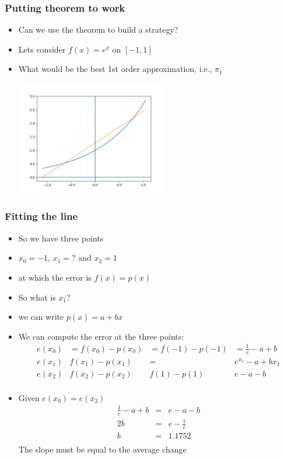 \documentclass[10pt]{beamer}
\begin{document}
\begin{frame}
  \frametitle{Putting theorem to work}
  \begin{itemize}
  \item Can we use the theorem to build a strategy? 
  \item Lets consider $f(x) = e^x \mbox{ on } [-1, 1]$
  \item What would be the best 1st order approximation, i.e., $\pi_1$
    \centerline{\includegraphics[height=5cm]{figure_1}}
  \end{itemize}
\end{frame}

\begin{frame}
  \frametitle{Fitting the line}
  \begin{itemize}
  \item So we have three points
  \item $x_0 = -1$, $x_1 = ? $ and $x_2 = 1$ 
  \item at which the error is $f(x) = p(x)$
  \item So what  is $x_1$?
  \item we can write $p(x) = a + b x$
  \item We can compute the error at the three points:
    \[
      \begin{array}{llll}
        e(x_0) & = f(x_0) - p(x_0) & = f(-1) - p(-1) & =\frac{1}{e} - a + b\\
        e(x_1) & f(x_1) - p(x_1) & = &  e^{x_1} - a + b x_1\\
        e(x_2) & f(x_2) - p(x_2) & f(1) - p(1) & e - a - b\\
      \end{array}
    \]
    
  \item Given $e(x_0) = e(x_2)$
    \[
      \begin{array}{ccc}
        \frac{1}{e} - a + b & = & e - a - b\\
        2 b & = & e - \frac{1}{e} \\
        b   & = & 1.1752\\
      \end{array}
    \] The slope must be equal to the average change
  \end{itemize}
\end{frame}
\end{document}
